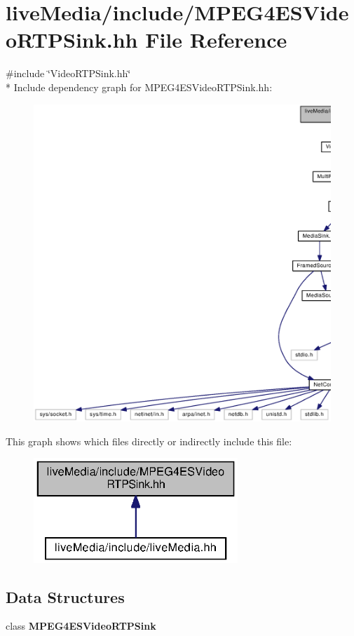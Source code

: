\section{live\+Media/include/\+M\+P\+E\+G4\+E\+S\+Video\+R\+T\+P\+Sink.hh File Reference}
\label{MPEG4ESVideoRTPSink_8hh}
{\ttfamily \#include \char`\"{}Video\+R\+T\+P\+Sink.\+hh\char`\"{}}\\*
Include dependency graph for M\+P\+E\+G4\+E\+S\+Video\+R\+T\+P\+Sink.\+hh\+:
\nopagebreak
\begin{figure}[H]
\begin{center}
\leavevmode
\includegraphics[width=350pt]{MPEG4ESVideoRTPSink_8hh__incl}
\end{center}
\end{figure}
This graph shows which files directly or indirectly include this file\+:
\nopagebreak
\begin{figure}[H]
\begin{center}
\leavevmode
\includegraphics[width=218pt]{MPEG4ESVideoRTPSink_8hh__dep__incl}
\end{center}
\end{figure}
\subsection*{Data Structures}
\begin{DoxyCompactItemize}
\item 
class {\bf M\+P\+E\+G4\+E\+S\+Video\+R\+T\+P\+Sink}
\end{DoxyCompactItemize}
